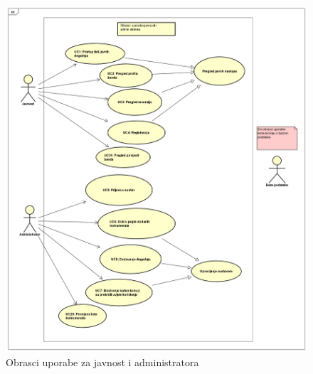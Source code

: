 		\begin{figure}[H]
		\begin{center}
			\includegraphics[width=17cm]{slike/javnost_admin2.PNG}
		\end{center}
		\caption{Obrasci uporabe za javnost i administratora}
		\label{fig:ou2}
	\end{figure}

